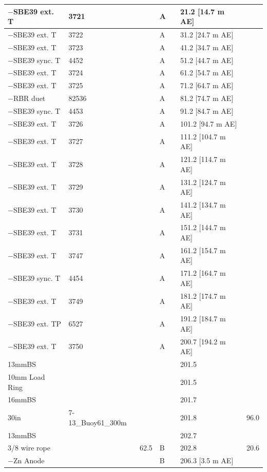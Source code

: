 \documentclass{article}
\begin{document}
\begin{tabularx}{\linewidth}{|X|X|l|l|l|X|l|}
$-$SBE39 ext. T & 3721 &  & A &  & 21.2 [14.7 m AE] &  \\ \hline
$-$SBE39 ext. T & 3722 &  & A &  & 31.2 [24.7 m AE] &  \\ \hline
$-$SBE39 ext. T & 3723 &  & A &  & 41.2 [34.7 m AE] &  \\ \hline
$-$SBE39 sync. T & 4452 &  & A &  & 51.2 [44.7 m AE] &  \\ \hline
$-$SBE39 ext. T & 3724 &  & A &  & 61.2 [54.7 m AE] &  \\ \hline
$-$SBE39 ext. T & 3725 &  & A &  & 71.2 [64.7 m AE] &  \\ \hline
$-$RBR duet & 82536 &  & A &  & 81.2 [74.7 m AE] &  \\ \hline
$-$SBE39 sync. T & 4453 &  & A &  & 91.2 [84.7 m AE] &  \\ \hline
$-$SBE39 ext. T & 3726 &  & A &  & 101.2 [94.7 m AE] &  \\ \hline
$-$SBE39 ext. T & 3727 &  & A &  & 111.2 [104.7 m AE] &  \\ \hline
$-$SBE39 ext. T & 3728 &  & A &  & 121.2 [114.7 m AE] &  \\ \hline
$-$SBE39 ext. T & 3729 &  & A &  & 131.2 [124.7 m AE] &  \\ \hline
$-$SBE39 ext. T & 3730 &  & A &  & 141.2 [134.7 m AE] &  \\ \hline
$-$SBE39 ext. T & 3731 &  & A &  & 151.2 [144.7 m AE] &  \\ \hline
$-$SBE39 ext. T & 3747 &  & A &  & 161.2 [154.7 m AE] &  \\ \hline
$-$SBE39 sync. T & 4454 &  & A &  & 171.2 [164.7 m AE] &  \\ \hline
$-$SBE39 ext. T & 3749 &  & A &  & 181.2 [174.7 m AE] &  \\ \hline
$-$SBE39 ext. TP & 6527 &  & A &  & 191.2 [184.7 m AE] &  \\ \hline
$-$SBE39 ext. T & 3750 &  & A &  & 200.7 [194.2 m AE] &  \\ \hline
13mmBS &  &  &  &  & 201.5 &  \\ \hline
10mm Load Ring &  &  &  &  & 201.5 &  \\ \hline
16mmBS &  &  &  &  & 201.7 &  \\ \hline
30in & 7-13\_Buoy61\_300m &  &  &  & 201.8 & 96.0 \\ \hline
13mmBS &  &  &  &  & 202.7 &  \\ \hline
3/8 wire rope &  & 62.5 & B &  & 202.8 & 20.6 \\ \hline
$-$Zn Anode &  &  & B &  & 206.3 [3.5 m AE] &  \\ \hline

\end{tabularx}
\end{document}
